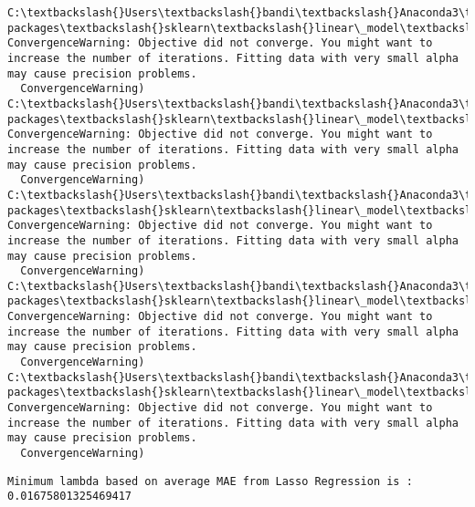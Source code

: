 \documentclass[11pt]{article}
\begin{document}
    \begin{Verbatim}[commandchars=\\\{\}]
C:\textbackslash{}Users\textbackslash{}bandi\textbackslash{}Anaconda3\textbackslash{}lib\textbackslash{}site-packages\textbackslash{}sklearn\textbackslash{}linear\_model\textbackslash{}coordinate\_descent.py:491: ConvergenceWarning: Objective did not converge. You might want to increase the number of iterations. Fitting data with very small alpha may cause precision problems.
  ConvergenceWarning)
C:\textbackslash{}Users\textbackslash{}bandi\textbackslash{}Anaconda3\textbackslash{}lib\textbackslash{}site-packages\textbackslash{}sklearn\textbackslash{}linear\_model\textbackslash{}coordinate\_descent.py:491: ConvergenceWarning: Objective did not converge. You might want to increase the number of iterations. Fitting data with very small alpha may cause precision problems.
  ConvergenceWarning)
C:\textbackslash{}Users\textbackslash{}bandi\textbackslash{}Anaconda3\textbackslash{}lib\textbackslash{}site-packages\textbackslash{}sklearn\textbackslash{}linear\_model\textbackslash{}coordinate\_descent.py:491: ConvergenceWarning: Objective did not converge. You might want to increase the number of iterations. Fitting data with very small alpha may cause precision problems.
  ConvergenceWarning)
C:\textbackslash{}Users\textbackslash{}bandi\textbackslash{}Anaconda3\textbackslash{}lib\textbackslash{}site-packages\textbackslash{}sklearn\textbackslash{}linear\_model\textbackslash{}coordinate\_descent.py:491: ConvergenceWarning: Objective did not converge. You might want to increase the number of iterations. Fitting data with very small alpha may cause precision problems.
  ConvergenceWarning)
C:\textbackslash{}Users\textbackslash{}bandi\textbackslash{}Anaconda3\textbackslash{}lib\textbackslash{}site-packages\textbackslash{}sklearn\textbackslash{}linear\_model\textbackslash{}coordinate\_descent.py:491: ConvergenceWarning: Objective did not converge. You might want to increase the number of iterations. Fitting data with very small alpha may cause precision problems.
  ConvergenceWarning)

    \end{Verbatim}

    \begin{Verbatim}[commandchars=\\\{\}]
Minimum lambda based on average MAE from Lasso Regression is : 0.01675801325469417

    \end{Verbatim}
\end{document}
